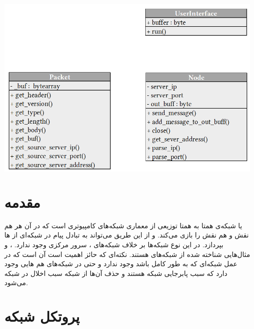 \documentclass{article}
\begin{document}
\begin{center}
	\vspace*{6cm}
	\includegraphics[scale=0.9]{UML2}
\end{center}
	
	


\newpage
\section{مقدمه}
 یا شبکه‌ی همتا به همتا توزیعی از معماری شبکه‌های کامپیوتری است که در آن هر  هم نقش  و هم نقش  را بازی می‌کند. و از این طریق می‌تواند به تبادل پیام در شبکه‌ای از ها بپردازد. در این نوع شبکه‌ها بر خلاف شبکه‌های ، سرور مرکزی وجود ندارد. ،  و  مثال‌هایی شناخته شده از شبکه‌های  هستند. نکته‌ای که حائز اهمیت است آن است که در عمل شبکه‌ای که به طور کامل  باشد وجود ندارد و حتی در شبکه‌های  هم هایی وجود دارد که سبب پابرجایی شبکه هستند و حذف آن‌ها از شبکه سبب اخلال در شبکه می‌شود.



\section{پروتکل شبکه}
\end{document}
